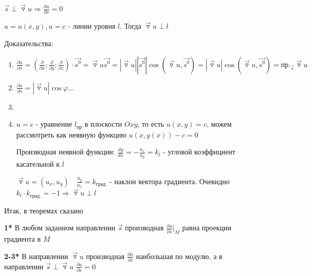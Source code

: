 \documentclass[12pt]{article}
\begin{document}
     $\overrightarrow{s} \perp \overrightarrow{\triangledown} u \Longrightarrow \frac{\partial u}{\partial s} = 0$

     $u = u(x, y), u = c$ - линии уровня $l$. Тогда $\overrightarrow{\triangledown} u \perp l$

    Доказательства:

    \begin{enumerate}
        \item $\frac{\partial u}{\partial s} = \left(\frac{\partial}{\partial x}; \frac{\partial}{\partial y}; \frac{\partial}{\partial z}\right) \cdot \overrightarrow{s^0} =
        \overrightarrow{\triangledown} u \overrightarrow{s^0} = |\overrightarrow{\triangledown} u| |\overrightarrow{s^0}| \cos(\overrightarrow{\triangledown} u, \overrightarrow{s^0}) =
        |\overrightarrow{\triangledown} u| \cos(\overrightarrow{\triangledown} u, \overrightarrow{s^0}) = \text{пр.}_{\overrightarrow{s}} \overrightarrow{\triangledown} u$

        \item $\frac{\partial u}{\partial s} = |\overrightarrow{\triangledown} u| \cos\varphi \dots $ \Lab

        \item \Lab

        \item $u = c$ - уравнение $l_{\text{пр}}$ в плоскости $Oxy$, то есть $u(x, y) = c$, можем рассмотреть как неявную функцию $u(x, y(x)) - c = 0$

        Производная неявной функции: $\frac{dy}{dx} = -\frac{u_x}{u_y} = k_l$ - угловой коэффициент касательной к $l$

        $\overrightarrow{\triangledown} u = (u_x, u_y) \quad \frac{u_y}{u_x} = k_{\text{град.}}$ - наклон вектора градиента.
        Очевидно $k_l \cdot k_{\text{град.}} = -1 \Longrightarrow \overrightarrow{\triangledown} u \perp l$
    \end{enumerate}



    \Nota Итак, в теоремах сказано

    \textbf{1*} В любом заданном направлении $\overrightarrow{s}$ производная $\frac{\partial u}{\partial s} |_M$ равна проекции градиента в $M$

    \textbf{2-3*} В направлении $\overrightarrow{\triangledown} u$ производная $\frac{\partial u}{\partial s}$ наибольшая по модулю,
    а в направлении $\overrightarrow{s} \perp \overrightarrow{\triangledown} u$ $\frac{\partial u}{\partial s} = 0$
\end{document}
